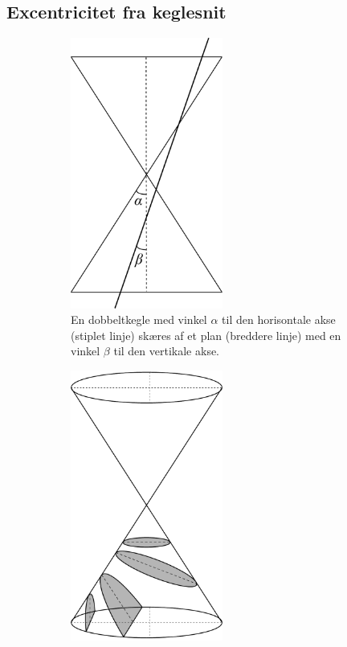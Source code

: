 \subsection{Excentricitet fra keglesnit}
\begin{figure}[h!]
	\centering
	\begin{subfigure}{0.45\textwidth}
		\centering
		\includegraphics[width=0.55\textwidth]{Planetbevaegelse/KeglePlan.pdf}
		\caption{En dobbeltkegle med vinkel $\alpha$ til den horisontale akse (stiplet linje) skæres af et plan (breddere linje) med en vinkel $\beta$ til den vertikale akse.}
		\label{fig:KeglePlan}
	\end{subfigure}
	\hspace{5mm}
	\begin{subfigure}{0.45\textwidth}
		\centering
		\includegraphics[width=0.55\textwidth]{Planetbevaegelse/KegleOrbit.pdf}

\end{subfigure}
\end{figure}
